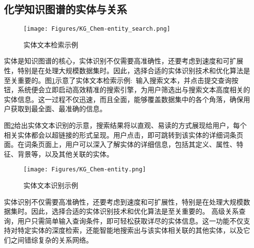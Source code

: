 \subsection{化学知识图谱的实体与关系}
\begin{figure}[h!]
	\vskip -10pt
\centering
\texttt{[image: Figures/KG\_Chem-entity\_search.png]}
\caption{\small\textrm{实体文本检索示例}}%
\label{Fig:KG-Chem_entity_search}
\end{figure}
实体是知识图谱的核心，实体识别不仅需要高准确性，还要考虑到速度和可扩展性，特别是在处理大规模数据集时。因此，选择合适的实体识别技术和优化算法是至关重要的。图\ref{Fig:KG-Chem_entity_search}示意了实体文本检索示例:~输入搜索文本，并点击提交查询按钮，系统便会立即启动高效精准的搜索引擎，为用户筛选出与搜索文本高度相关的实体信息。这一过程不仅迅速，而且全面，能够覆盖数据集中的各个角落，确保用户获取到最全面、最准确的信息。

图\ref{Fig:KG-Chem_entity}给出实体文本识别的示意，搜索结果将以直观、易读的方式展现给用户，每个相关实体都会以超链接的形式呈现。用户点击，即可跳转到该实体的详细词条页面。在词条页面上，用户可以深入了解实体的详细信息，包括其定义、属性、特征、背景等，以及其他关联的实体。

\begin{figure}[h!]
\centering
\texttt{[image: Figures/KG\_Chem-entity.png]}
\caption{\small\textrm{实体文本识别示例}}%
\label{Fig:KG-Chem_entity}
\end{figure}
实体识别不仅需要高准确性，还要考虑到速度和可扩展性，特别是在处理大规模数据集时。因此，选择合适的实体识别技术和优化算法是至关重要的。
高级关系查询，用户只需简单输入查询条件，即可轻松获取详尽的实体信息。这一功能不仅支持对特定实体的深度检索，还能智能地搜索出与该实体相关联的其他实体，以及它们之间错综复杂的关系网络。


